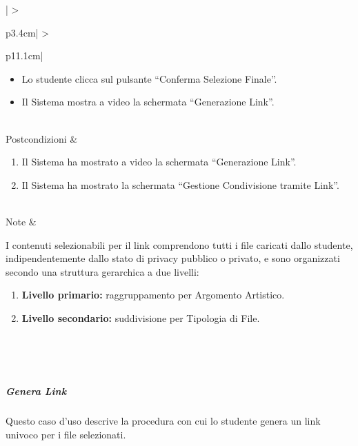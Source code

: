 \documentclass[12pt,a4paper]{article}
\begin{document}
\begin{longtable}{|
>{\color{white}\bfseries\raggedright\arraybackslash}p{3.4cm}|
>{\raggedright\arraybackslash}p{11.1cm}|}
\begin{enumerate}[topsep=0.2em,itemsep=0.15em,parsep=0pt,partopsep=0pt]
\begin{itemize}[topsep=0.15em,itemsep=0.1em,parsep=0pt,partopsep=0pt]
        \item[7.3.] Lo studente clicca sul pulsante ``Conferma Selezione Finale''.
        \item[7.4.] Il Sistema mostra a video la schermata ``Generazione Link''.
    \end{itemize}
\end{enumerate} \\ \hline
Postcondizioni &
\begin{enumerate}[topsep=0.2em,itemsep=0.15em,parsep=0pt,partopsep=0pt]
    \item Il Sistema ha mostrato a video la schermata ``Generazione Link''.
    \item Il Sistema ha mostrato la schermata ``Gestione Condivisione tramite Link''.
\end{enumerate} \\ \hline
Note &
\begin{minipage}[t]{\linewidth}
I contenuti selezionabili per il link comprendono tutti i file caricati dallo studente, indipendentemente dallo stato di privacy pubblico o privato, e sono organizzati secondo una struttura gerarchica a due livelli:
\begin{enumerate}[topsep=0.2em,itemsep=0.15em,parsep=0pt,partopsep=0pt]
    \item \textbf{Livello primario:} raggruppamento per Argomento Artistico.
    \item \textbf{Livello secondario:} suddivisione per Tipologia di File.
\end{enumerate}
\end{minipage} \\ \hline
\caption{Scheda di dettaglio del Caso d'Uso Selezione Contenuti}
\label{tab:uc_selezione_contenuti_link}\\
\end{longtable}
\normalsize

\newpage
\subparagraph{Genera Link}

Questo caso d'uso descrive la procedura con cui lo studente genera un link univoco per i file selezionati.
\end{document}
